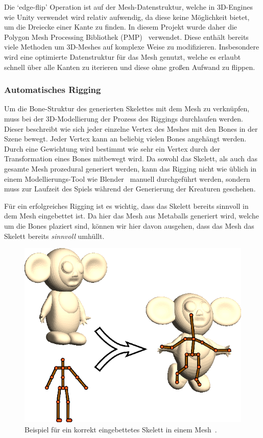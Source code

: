 Die `edge-flip' Operation ist auf der Mesh-Datenstruktur, welche in 3D-Engines wie Unity verwendet wird relativ aufwendig, da diese keine Möglichkeit bietet, um die Dreiecke einer Kante zu finden. In diesem Projekt wurde daher die Polygon Mesh Processing Bibliothek (PMP)~\cite{pmp-library} verwendet. Diese enthält bereits viele Methoden um 3D-Meshes auf komplexe Weise zu modifizieren. Insbesondere wird eine optimierte Datenstruktur für das Mesh genutzt, welche es erlaubt schnell über alle Kanten zu iterieren und diese ohne großen Aufwand zu flippen.

\subsubsection{Automatisches Rigging}
Um die Bone-Struktur des generierten Skelettes mit dem Mesh zu verknüpfen, muss bei der 3D-Modellierung der Prozess des Riggings durchlaufen werden. Dieser beschreibt wie sich jeder einzelne Vertex des Meshes mit den Bones in der Szene bewegt. Jeder Vertex kann an beliebig vielen Bones angehängt werden. Durch eine Gewichtung wird bestimmt wie sehr ein Vertex durch der Transformation eines Bones mitbewegt wird.
Da sowohl das Skelett, als auch das gesamte Mesh prozedural generiert werden, kann das Rigging nicht wie üblich in einem Modellierungs-Tool wie Blender~\cite{blender} manuell durchgeführt werden, sondern muss zur Laufzeit des Spiels während der Generierung der Kreaturen geschehen.

Für ein erfolgreiches Rigging ist es wichtig, dass das Skelett bereits sinnvoll in dem Mesh eingebettet ist. Da hier das Mesh aus Metaballs generiert wird, welche um die Bones plaziert sind, können wir hier davon ausgehen, dass das Mesh das Skelett bereits \emph{sinnvoll} umhüllt.

\begin{figure}[h!]
	\centering
	\includegraphics[width=0.6\linewidth]{resources/img/skeleton_embedding.png}
	\caption{Beispiel für ein korrekt eingebettetes Skelett in einem Mesh~\cite{bone_heat_paper}.}
	\label{fig:skeleton_embedding}
\end{figure}

